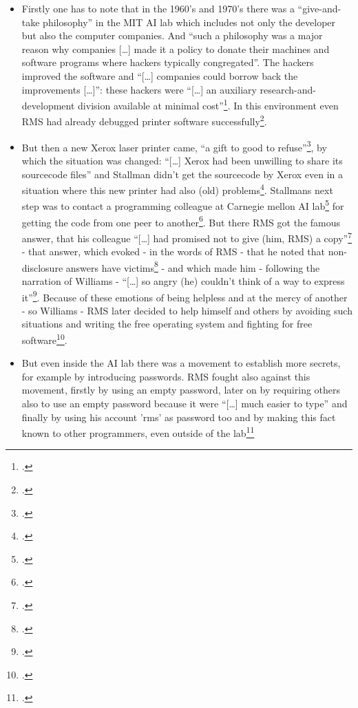 \documentclass[DIV=calc,BCOR=5mm,11pt,headings=small,oneside,abstract=true, toc=bib]{scrartcl}
\begin{document}
\begin{itemize}
  \item Firstly one has to note that in the 1960's and 1970's there was a
  \enquote{give-and-take philosophy} in the MIT AI lab which includes not
  only the developer but also the computer companies. And \enquote{such a
  philosophy was a major reason why companies [\ldots] made it a policy
  to donate their machines and software programs where hackers typically
  congregated}. The hackers improved the software and \enquote{[\ldots]
  companies could borrow back the improvements [\ldots]}: these hackers
  were \enquote{[\ldots] an auxiliary research-and-development division
  available at minimal cost}\footcite[cf][4]{Williams2002a}. In this
  environment even RMS had already debugged printer software
  successfully\footcite[cf][3 and 5]{Williams2002a}.
  \item But then a new Xerox laser printer came, \enquote{a gift to good to
  refuse}\footcite[cf][2]{Williams2002a}, by which the situation was
  changed: \enquote{[\ldots] Xerox had been unwilling to share its
  sourcecode files} and Stallman didn't get the sourcecode by Xerox even
  in a situation where this new printer had also (old)
  problems\footcite[cf][6]{Williams2002a}. Stallmans next step was to contact a
  programming colleague at Carnegie mellon AI lab\footcite[cf][7]{Williams2002a}
  for getting the code from one peer to another\footcite[cf][8]{Williams2002a}.
  But there RMS got the famous answer, that his colleague \enquote{[\ldots]
  had promised not to give (him, RMS) a
  copy}\footcite[cf][8]{Williams2002a} - that answer, which evoked - in
  the words of RMS - that he noted that non-disclosure answers have
  victims\footcite[cf][158]{Stallman2001a} - and which made him - following the
  narration of Williams - \enquote{[\ldots] so angry (he) couldn't think of a way
  to express it}\footcite[cf][9]{Williams2002a}. Because of these emotions
  of being helpless and at the mercy of another - so Williams - RMS later
  decided to help himself and others by avoiding such situations and writing the
  free operating system and fighting for free
  software\footcite[cf][11f]{Williams2002a}.
  \item But even inside the AI lab there was a movement to establish more
  secrets, for example by introducing passwords. RMS fought also against this
  movement, firstly by using an empty password, later on by requiring others
  also to use an empty password because it were \enquote{[\ldots] much easier to
  type} and finally by using his account 'rms' as password too and by
  making this fact known to other programmers, even outside of the
  lab\footcite[cf][53ff, 93f et passim]{Williams2002a}
\end{itemize}
\end{document}
